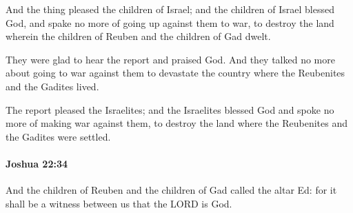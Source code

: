 			\begin{versebox}
					\item[BHS] 
					\item[ASV] And the thing pleased the children of Israel; and the children of Israel blessed God, and spake no more of going up against them to war, to destroy the land wherein the children of Reuben and the children of Gad dwelt.
					\item[NIV] They were glad to hear the report and praised God. And they talked no more about going to war against them to devastate the country where the Reubenites and the Gadites lived.
					\item[NRSV] The report pleased the Israelites; and the Israelites blessed God and spoke no more of making war against them, to destroy the land where the Reubenites and the Gadites were settled.
			\end{versebox}

		\paragraph{Joshua 22:34} %
			\label{JOSHUA-22-34}

			And the children of Reuben and the children of Gad called the altar Ed: for it shall be a witness between us that the LORD is God.

